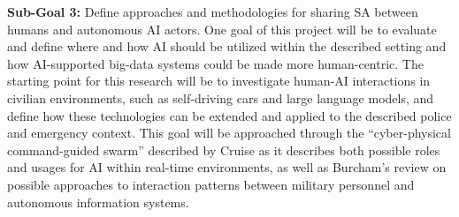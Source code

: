\textbf{Sub-Goal 3:} Define approaches and methodologies for sharing SA between humans and autonomous AI actors. One goal of this project will be to evaluate and define where and how AI should be utilized within the described setting and how AI-supported big-data systems could be made more human-centric. The starting point for this research will be to investigate human-AI interactions in civilian environments, such as self-driving cars and large language models, and define how these technologies can be extended and applied to the described police and emergency context. This goal will be approached through the “cyber-physical command-guided swarm” described by Cruise \cite{cruise_cyber-physical_2018} as it describes both possible roles and usages for AI within real-time environments, as well as Burcham’s \cite{burcham_comprehensive_nodate} review on possible approaches to interaction patterns between military personnel and autonomous information systems.
